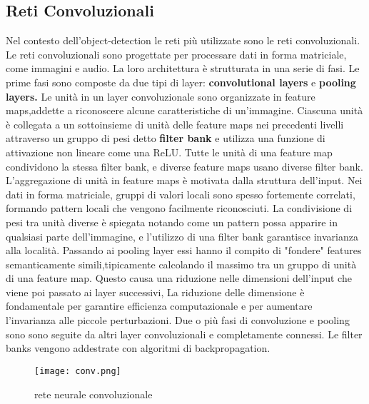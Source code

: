 \subsection{Reti Convoluzionali}
Nel contesto dell'object-detection le reti più utilizzate sono le reti convoluzionali. Le reti convoluzionali sono  progettate per processare dati in forma 
matriciale, come immagini e audio. La loro architettura è strutturata in una serie di fasi. Le prime fasi sono composte da due tipi di layer: \textbf{convolutional layers}
e \textbf{pooling layers.}
Le unità in un layer convoluzionale sono organizzate in feature maps,addette a riconoscere alcune caratteristiche di un'immagine. Ciascuna unità è collegata
a un sottoinsieme di unità delle feature maps nei precedenti livelli attraverso un gruppo di pesi detto \textbf{filter bank} e utilizza una funzione di attivazione non lineare come una ReLU. Tutte le unità di una feature map condividono 
la stessa filter bank, e diverse feature maps usano diverse filter bank. L'aggregazione di unità in feature maps è motivata dalla struttura dell'input. Nei dati in forma matriciale, gruppi di valori locali sono spesso fortemente correlati,
formando pattern locali che vengono facilmente riconosciuti. La condivisione di pesi tra unità  diverse è spiegata notando come un pattern possa apparire in qualsiasi parte dell'immagine, e l'utilizzo di una filter bank garantisce invarianza alla località.
Passando ai pooling layer essi hanno il compito di "fondere" features semanticamente simili,tipicamente calcolando il massimo tra un gruppo di unità di una feature map. Questo causa una riduzione nelle dimensioni dell'input che viene poi passato
ai layer successivi, La riduzione delle dimensione è fondamentale per garantire efficienza computazionale e per aumentare l'invarianza alle piccole perturbazioni.
Due o più fasi di convoluzione e pooling sono  sono seguite da altri layer convoluzionali e completamente connessi. Le filter banks vengono addestrate con algoritmi di backpropagation.\cite{deep}
\begin{figure}[h]
  \texttt{[image: conv.png]}
  \caption{rete neurale convoluzionale}
  \label{fig:conv}
\end{figure} 





    